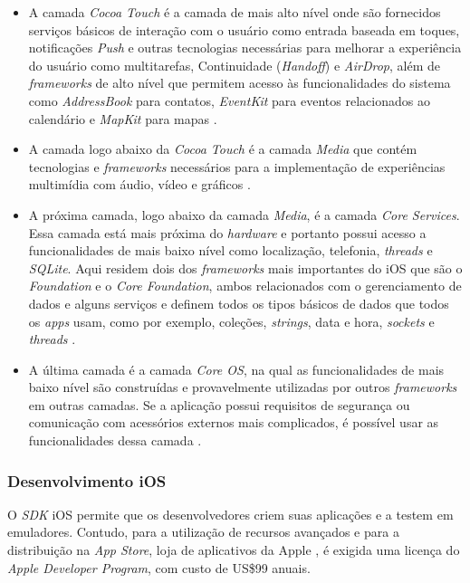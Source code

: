 \begin{itemize}
	\item A camada \textit{Cocoa Touch} é a camada de mais alto nível onde são fornecidos serviços básicos de interação 
    com o usuário como entrada baseada em toques, notificações \textit{Push} e outras tecnologias necessárias para
     melhorar a experiência do usuário como multitarefas, Continuidade (\textit{Handoff}) e \textit{AirDrop}, além de \textit{frameworks} 
     de alto nível que permitem acesso às funcionalidades do sistema como \textit{AddressBook} para contatos, \textit{EventKit} 
     para eventos relacionados ao calendário e \textit{MapKit} para mapas \cite{apple_inc_tech_2014}.
	\item A camada logo abaixo da \textit{Cocoa Touch} é a camada \textit{Media} que contém tecnologias e \textit{frameworks} necessários 
    para a implementação de experiências multimídia com áudio, vídeo e gráficos \cite{apple_inc_tech_2014}.
	\item A próxima camada, logo abaixo da camada \textit{Media}, é a camada \textit{Core Services}. Essa camada está mais próxima 
    do \textit{hardware} e portanto possui acesso a funcionalidades de mais baixo nível como localização, telefonia, \textit{threads} 
    e \textit{SQLite}. Aqui residem dois dos \textit{frameworks} mais importantes do iOS que são o \textit{Foundation} e o \textit{Core Foundation}, 
    ambos relacionados com o gerenciamento de dados e alguns serviços e definem todos os tipos básicos de dados que 
    todos os \textit{apps} usam, como por exemplo, coleções, \textit{strings}, data e hora, \textit{sockets} e \textit{threads} \cite{apple_inc_tech_2014}.
	\item A última camada é a camada \textit{Core OS}, na qual as funcionalidades de mais baixo nível são construídas e 
    provavelmente utilizadas por outros \textit{frameworks} em outras camadas. Se a aplicação possui requisitos de segurança 
    ou comunicação com acessórios externos mais complicados, é possível usar as funcionalidades dessa camada \cite{apple_inc_tech_2014}.
\end{itemize}

\subsubsection{Desenvolvimento iOS} \label{subsubsection-dev-ios}

O \textit{SDK} iOS permite que os desenvolvedores criem suas aplicações e a testem em emuladores. 
Contudo, para a utilização de recursos avançados e para a distribuição 
na \textit{App Store}, loja de aplicativos da Apple \cite{apple_inc_program_2016}, é exigida uma licença do \textit{Apple Developer Program}, com custo de US\$99 anuais.   


